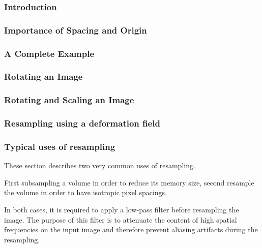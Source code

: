 \subsubsection{Introduction}

\ifitkFullVersion

\fi

\subsubsection{Importance of Spacing and Origin}
\ifitkFullVersion

\fi

\subsubsection{A Complete Example}
\ifitkFullVersion

\fi

\subsubsection{Rotating an Image}
\ifitkFullVersion

\fi

\subsubsection{Rotating and Scaling an Image}
\ifitkFullVersion

\fi

\subsubsection{Resampling using a deformation field}
\ifitkFullVersion

\fi


\subsubsection{Typical uses of resampling}

These section describes two very common uses of resampling.

First subsampling a volume in order to reduce its memory size, second resample
the volume in order to have isotropic pixel spacings.

In both cases, it is required to apply a low-pass filter before resampling the
image. The purpose of this filter is to attenuate the content of high spatial
frequencies on the input image and therefore prevent aliasing artifacts during
the resampling. 

\ifitkFullVersion

\fi


\ifitkFullVersion

\fi



